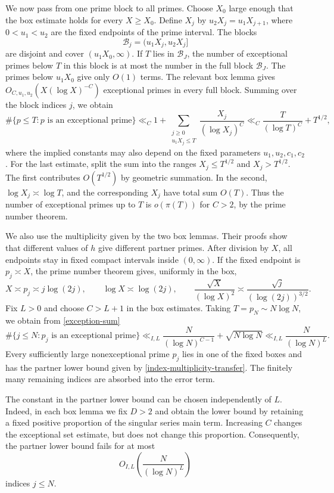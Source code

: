 \documentclass[12pt,reqno]{amsart}
\numberwithin{equation}{section}
\theoremstyle{plain}
\theoremstyle{remark}
\begin{document}
We now pass from one prime block to all primes.  Choose $X_0$ large
enough that the box estimate holds for every $X\geq X_0$.  Define
$X_j$ by $u_2X_j=u_1X_{j+1}$, where $0<u_1<u_2$ are the fixed
endpoints of the prime interval.  The blocks
\[
 \mathcal B_j=(u_1X_j,u_2X_j]
\]
are disjoint and cover $(u_1X_0,\infty)$.  If $T$ lies in
$\mathcal B_J$, the number of exceptional primes below $T$ in this
block is at most the number in the full block $\mathcal B_J$.  The
primes below $u_1X_0$ give only $O(1)$ terms.  The relevant box lemma
gives $O_{C,u_1,u_2}(X(\log X)^{-C})$ exceptional primes in every full
block.
Summing over the block indices $j$, we obtain
\begin{equation}\label{exception-sum}
 \#\{p\leq T:p\text{ is an exceptional prime}\}
 \ll_C 1+
 \sum_{\substack{j\geq0\\u_1X_j\leq T}}
 \frac{X_j}{(\log X_j)^C}
 \ll_C \frac{T}{(\log T)^C}+T^{1/2},
\end{equation}
where the implied constants may also depend on the fixed parameters
$u_1,u_2,c_1,c_2$.
For the last estimate, split the sum into the ranges
$X_j\leq T^{1/2}$ and $X_j>T^{1/2}$.
The first contributes $O(T^{1/2})$ by geometric summation.
In the second, $\log X_j\asymp\log T$, and the corresponding
$X_j$ have total sum $O(T)$.
Thus the number of exceptional primes up to $T$ is
$o(\pi(T))$ for $C>2$, by the prime number theorem.

We also use the multiplicity given by the two box lemmas.  Their
proofs show that different values of $h$ give different partner
primes.  After division by $X$, all endpoints stay in fixed compact
intervals inside $(0,\infty)$.  If the fixed endpoint is
$p_j\asymp X$, the prime number theorem gives, uniformly in the box,
\begin{equation}\label{index-multiplicity-transfer}
 X\asymp p_j\asymp j\log(2j),\qquad
 \log X\asymp\log(2j),\qquad
 \frac{\sqrt X}{(\log X)^2}
 \asymp\frac{\sqrt j}{(\log(2j))^{3/2}}.
\end{equation}
Fix $L>0$ and choose $C>L+1$ in the box estimates.
Taking $T=p_N\sim N\log N$, we obtain from
\eqref{exception-sum}
\[
 \#\{j\leq N:p_j\text{ is an exceptional prime}\}
 \ll_{I,L}
 \frac{N}{(\log N)^{C-1}}+\sqrt{N\log N}
 \ll_{I,L}\frac{N}{(\log N)^L}.
\]
Every sufficiently large nonexceptional prime $p_j$ lies in
one of the fixed boxes and has the partner lower bound
given by \eqref{index-multiplicity-transfer}.
The finitely many remaining indices are absorbed into
the error term.

The constant in the partner lower bound can be chosen
independently of $L$.  Indeed, in each box lemma we fix
$D>2$ and obtain the lower bound by retaining a fixed
positive proportion of the singular series main term.
Increasing $C$ changes the exceptional set estimate, but does not change this proportion.
Consequently, the partner lower bound fails for at most
\[
 O_{I,L}\left(\frac{N}{(\log N)^L}\right)
\]
indices $j\leq N$.
\end{document}
